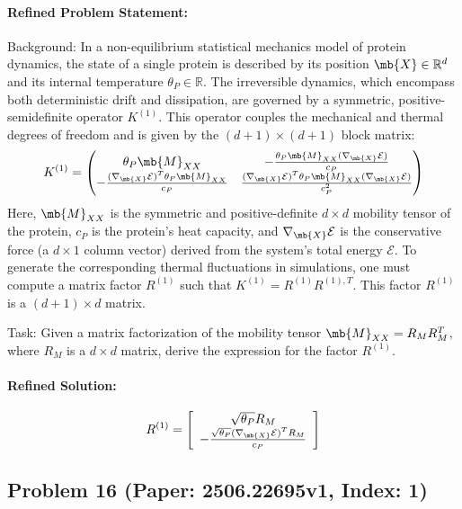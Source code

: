 \documentclass[10pt]{article}
\begin{document}
\paragraph*{Refined Problem Statement:}
Background:
In a non-equilibrium statistical mechanics model of protein dynamics, the state of a single protein is described by its position $\mb{X} \in \mathbb{R}^d$ and its internal temperature $\theta_P \in \mathbb{R}$. The irreversible dynamics, which encompass both deterministic drift and dissipation, are governed by a symmetric, positive-semidefinite operator $K^{(1)}$. This operator couples the mechanical and thermal degrees of freedom and is given by the $(d+1) \times (d+1)$ block matrix:
\begin{equation*}
K^{(1)} = 
\begin{pmatrix}
\theta_P \mb{M}_{\tiny XX} & -\frac{\theta_P \mb{M}_{\tiny XX}(\nabla_{\mb{X}} \mathcal{E})}{c_P} \\
-\frac{(\nabla_{\mb{X}} \mathcal{E})^{T}\theta_P \mb{M}_{\tiny XX}}{c_P} & \frac{(\nabla_{\mb{X}} \mathcal{E})^{T}\theta_P \mb{M}_{\tiny XX}(\nabla_{\mb{X}} \mathcal{E})}{c_P^2}
\end{pmatrix}
\end{equation*}
Here, $\mb{M}_{\tiny XX}$ is the symmetric and positive-definite $d \times d$ mobility tensor of the protein, $c_P$ is the protein's heat capacity, and $\nabla_{\mb{X}} \mathcal{E}$ is the conservative force (a $d \times 1$ column vector) derived from the system's total energy $\mathcal{E}$. To generate the corresponding thermal fluctuations in simulations, one must compute a matrix factor $R^{(1)}$ such that $K^{(1)} = R^{(1)}R^{(1),T}$. This factor $R^{(1)}$ is a $(d+1) \times d$ matrix.

Task:
Given a matrix factorization of the mobility tensor $\mb{M}_{\tiny XX} = R_M R_M^T$, where $R_M$ is a $d \times d$ matrix, derive the expression for the factor $R^{(1)}$.

\paragraph*{Refined Solution:}
\[ R^{(1)} = \left[\begin{array}{c} \sqrt{\theta_P}R_M \\ -\frac{\sqrt{\theta_P}(\nabla_{\mb{X}} \mathcal{E})^T R_M}{c_P} \end{array}\right] \]

\newpage
\subsection*{Problem 16 (Paper: 2506.22695v1, Index: 1)}
\end{document}
